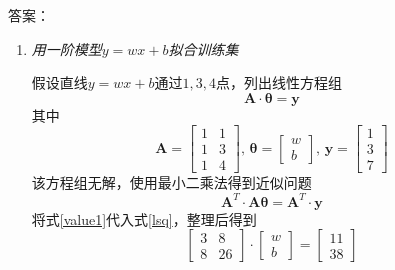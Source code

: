 \documentclass[11pt]{article}
\newenvironment{solution}[1][10cm]{答案：}{}
\newenvironment{solution}[1][10cm]{答案：\vspace{#1}\hide}
    {\endhide}
\newcommand{\mat}[1]{\bm{#1}}
\renewcommand{\vec}[1]{\bm{#1}}
\newcommand{\MA}{\mat{A}}
\newcommand{\Vy}{\vec{y}}
\newcommand{\Vt}{\vec{\theta}}
\begin{document}
\begin{solution}
    \begin{enumerate}[label=(\alph*)]
        \item \emph{用一阶模型$y=wx+b$拟合训练集}
        
        假设直线$y=wx+b$通过${1,3,4}$点，列出线性方程组
        \begin{equation}\label{ls}
            \MA\cdot\Vt=\Vy
        \end{equation}
        其中
        \begin{equation}\label{value1}
            \MA=\left[\begin{array}{rr}
                1 & 1 \\
                1 & 3 \\
                1 & 4
                \end{array}\right],\, 
            \Vt=\begin{bmatrix}
                w\\
                b
            \end{bmatrix},\,
            \Vy = \begin{bmatrix}
                1\\
                3\\
                7
            \end{bmatrix}
        \end{equation}
        该方程组无解，使用最小二乘法得到近似问题
        \begin{equation}
            \label{lsq}
            \MA^T\cdot\MA\Vt=\MA^T\cdot\Vy
        \end{equation}
        将式\ref{value1}代入式\ref{lsq}，整理后得到
        \begin{equation*}
            \left[\begin{array}{rr}
                3 & 8 \\
                8 & 26
                \end{array}\right]
                \cdot
                \begin{bmatrix}
                    w\\
                    b
                \end{bmatrix}
                =\begin{bmatrix}
                    11\\
                    38
                \end{bmatrix}
        \end{equation*}

\end{enumerate}
\end{solution}
\end{document}
